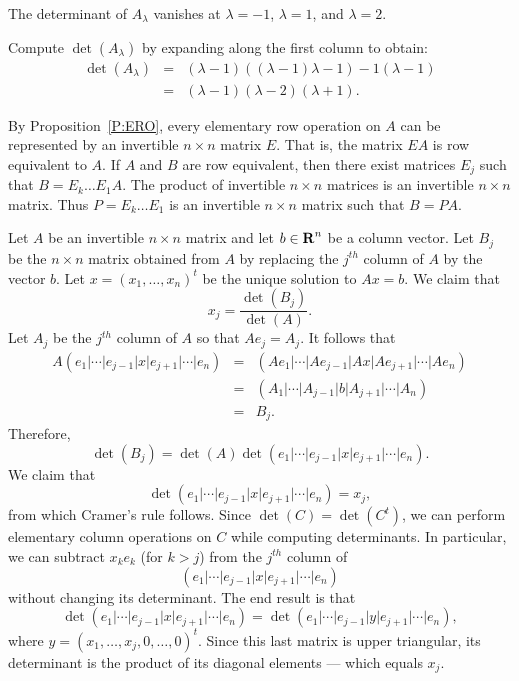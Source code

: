 \documentclass{ximera}
\begin{document}
\ans The determinant of $A_\lambda$ vanishes at $\lambda = -1$,
$\lambda = 1$, and $\lambda = 2$.

\soln Compute $\det(A_\lambda)$ by expanding along the first column
to obtain:
\[
\begin{array}{rcl}
\det(A_\lambda) & = &
(\lambda - 1)((\lambda - 1)\lambda - 1) - 1(\lambda - 1) \\
& = & (\lambda - 1)(\lambda - 2)(\lambda + 1).
\end{array}
\]

By Proposition~\ref{P:ERO}, every
elementary row operation on $A$ can be represented by an invertible $n
\times n$ matrix $E$.  That is, the matrix $EA$ is row equivalent to
$A$.  If $A$ and $B$ are row equivalent, then there exist matrices
$E_j$ such that $B = E_k\ldots E_1A$.  The product of invertible $n
\times n$ matrices is an invertible $n \times n$ matrix.  Thus $P =
E_k\ldots E_1$ is an invertible $n \times n$ matrix such that $B =
PA$.

Let $A$ be an invertible $n\times n$ matrix and let $b\in\mbox{$\bf{R}$}^n$ be a column 
vector. Let $B_j$ be the $n\times n$ matrix obtained from $A$ by replacing 
the $j^{th}$ column of $A$ by the vector $b$.  Let $x=(x_1,\ldots,x_n)^t$ be 
the unique solution to $Ax=b$.  We claim that
\[
x_j = \frac{\det(B_j)}{\det(A)}.
\]
Let $A_j$ be the $j^{th}$ column of $A$ so that $Ae_j=A_j$.  It follows that 
\begin{eqnarray*}
A (e_1|\cdots|e_{j-1}|x|e_{j+1}|\cdots|e_n) & = & 
(A e_1|\cdots|A e_{j-1}|A x|A e_{j+1}|\cdots|A e_n)\\
& = & (A_1|\cdots|A_{j-1}|b|A_{j+1}|\cdots|A_n) \\
& = & B_j.
\end{eqnarray*}
Therefore,
\[
\det(B_j) = \det(A)\det(e_1|\cdots|e_{j-1}|x|e_{j+1}|\cdots|e_n).
\]
We claim that 
\[
\det(e_1|\cdots|e_{j-1}|x|e_{j+1}|\cdots|e_n)=x_j,
\]
from which Cramer's rule follows.  Since $\det(C)=\det(C^t)$, we can perform
elementary column operations on $C$ while computing determinants.  In
particular, we can subtract $x_ke_k$ (for $k>j$) from the $j^{th}$ column of
\[
(e_1|\cdots|e_{j-1}|x|e_{j+1}|\cdots|e_n)
\]
without changing its determinant.  The end result is that 
\[
\det(e_1|\cdots|e_{j-1}|x|e_{j+1}|\cdots|e_n)=
\det(e_1|\cdots|e_{j-1}|y|e_{j+1}|\cdots|e_n),
\]
where $y=(x_1,\ldots,x_j,0,\ldots,0)^t$.  Since this last matrix is upper
triangular, its determinant is the product of its diagonal elements ---
which equals $x_j$. 
\end{document}
